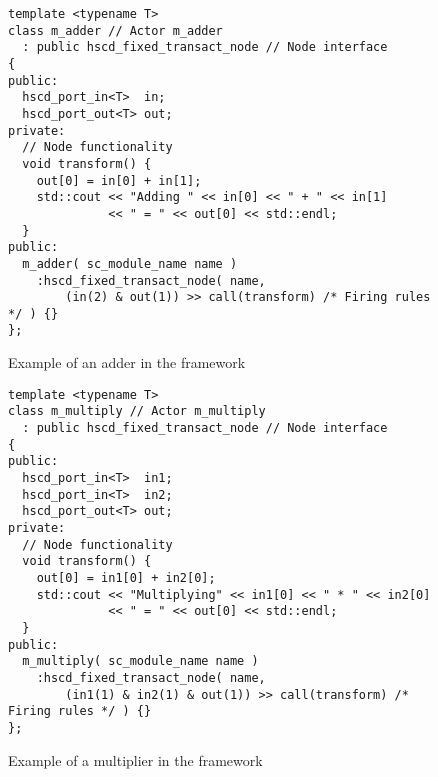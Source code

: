 \begin{figure}
\centering
\begin{verbatim}
template <typename T>
class m_adder // Actor m_adder
  : public hscd_fixed_transact_node // Node interface
{
public:
  hscd_port_in<T>  in;
  hscd_port_out<T> out;
private:
  // Node functionality
  void transform() {
    out[0] = in[0] + in[1];
    std::cout << "Adding " << in[0] << " + " << in[1]
              << " = " << out[0] << std::endl;
  }
public:
  m_adder( sc_module_name name )
    :hscd_fixed_transact_node( name,
        (in(2) & out(1)) >> call(transform) /* Firing rules */ ) {}
};
\end{verbatim}
\caption{\label{example-adder-actor}Example of an adder in the \SysteMoC{} framework}
\end{figure}

\begin{figure}
\centering
\begin{verbatim}
template <typename T>
class m_multiply // Actor m_multiply
  : public hscd_fixed_transact_node // Node interface
{
public:
  hscd_port_in<T>  in1;
  hscd_port_in<T>  in2;
  hscd_port_out<T> out;
private:
  // Node functionality
  void transform() {
    out[0] = in1[0] + in2[0];
    std::cout << "Multiplying" << in1[0] << " * " << in2[0]
              << " = " << out[0] << std::endl;
  }
public:
  m_multiply( sc_module_name name )
    :hscd_fixed_transact_node( name,
        (in1(1) & in2(1) & out(1)) >> call(transform) /* Firing rules */ ) {}
};
\end{verbatim}
\caption{\label{example-multiply-actor}Example of a multiplier in the \SysteMoC{} framework}
\end{figure}

%  

